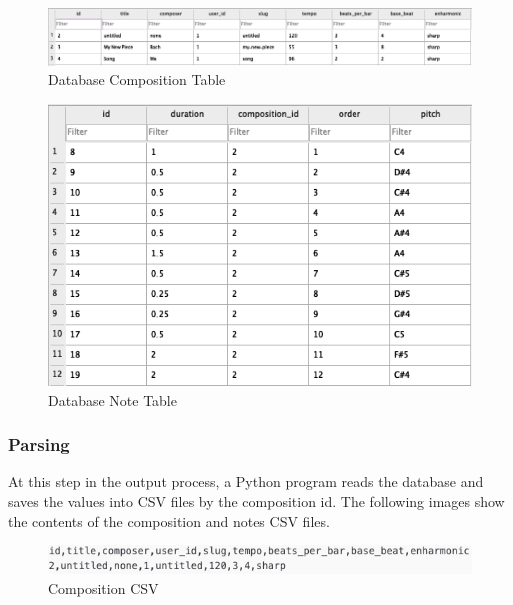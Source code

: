 \begin{figure}[!htbp]
	\centering
	\caption{Database Composition Table}
	\includegraphics[scale=0.45]{images/compositionTable.png}
\end{figure}

\begin{figure}[!htbp]
	\centering
	\caption{Database Note Table}
	\includegraphics[scale=0.45]{images/noteTable.png}
\end{figure}

\subsubsection{Parsing}
\label{subsubsec:parsing}

At this step in the output process, a Python program reads the database and saves the values into CSV files by the composition id.  The following images show the contents of the composition and notes CSV files.

\begin{figure}[!htbp]
	\centering
	\caption{Composition CSV}
	\includegraphics[scale=0.7]{images/compositionCSV.png}
\end{figure}

